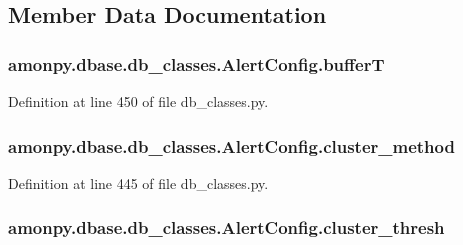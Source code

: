 \subsection{Member Data Documentation}
\hypertarget{classamonpy_1_1dbase_1_1db__classes_1_1_alert_config_af0aff8769055be290414b5bd6364d180}{
\subsubsection[{buffer\-T}]{\setlength{\rightskip}{0pt plus 5cm}amonpy.\-dbase.\-db\-\_\-classes.\-Alert\-Config.\-buffer\-T}}\label{classamonpy_1_1dbase_1_1db__classes_1_1_alert_config_af0aff8769055be290414b5bd6364d180}


Definition at line 450 of file db\-\_\-classes.\-py.

\hypertarget{classamonpy_1_1dbase_1_1db__classes_1_1_alert_config_aeb4dd54c70c114a00192659ba9881a9b}{
\subsubsection[{cluster\-\_\-method}]{\setlength{\rightskip}{0pt plus 5cm}amonpy.\-dbase.\-db\-\_\-classes.\-Alert\-Config.\-cluster\-\_\-method}}\label{classamonpy_1_1dbase_1_1db__classes_1_1_alert_config_aeb4dd54c70c114a00192659ba9881a9b}


Definition at line 445 of file db\-\_\-classes.\-py.

\hypertarget{classamonpy_1_1dbase_1_1db__classes_1_1_alert_config_ac3cf39c10bcacbd6209f3175788168f6}{
\subsubsection[{cluster\-\_\-thresh}]{\setlength{\rightskip}{0pt plus 5cm}amonpy.\-dbase.\-db\-\_\-classes.\-Alert\-Config.\-cluster\-\_\-thresh}}\label{classamonpy_1_1dbase_1_1db__classes_1_1_alert_config_ac3cf39c10bcacbd6209f3175788168f6}


